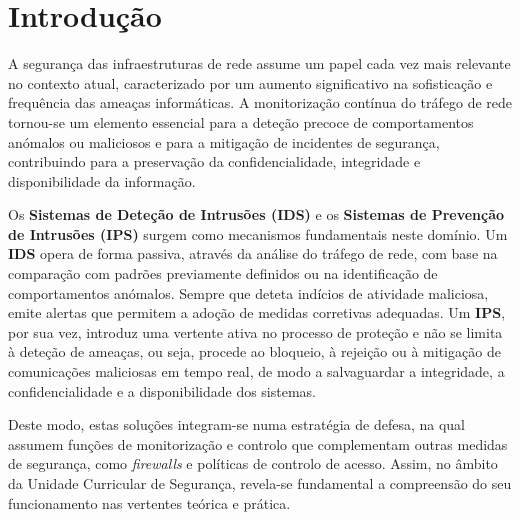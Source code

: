 
\chapter{Introdução}
A segurança das infraestruturas de rede assume um papel cada vez mais relevante no contexto atual, caracterizado por um aumento significativo na sofisticação e frequência das ameaças informáticas. A monitorização contínua do tráfego de rede tornou-se um elemento essencial para a deteção precoce de comportamentos anómalos ou maliciosos e para a mitigação de incidentes de segurança, contribuindo para a preservação da confidencialidade, integridade e disponibilidade da informação.

Os \textbf{Sistemas de Deteção de Intrusões (IDS)} e os \textbf{Sistemas de Prevenção de Intrusões (IPS)} surgem como mecanismos fundamentais neste domínio. Um \textbf{IDS} opera de forma passiva, através da análise do tráfego de rede, com base na comparação com padrões previamente definidos ou na identificação de comportamentos anómalos. Sempre que deteta indícios de atividade maliciosa, emite alertas que permitem a adoção de medidas corretivas adequadas. Um \textbf{IPS}, por sua vez, introduz uma vertente ativa no processo de proteção e não se limita à deteção de ameaças, ou seja, procede ao bloqueio, à rejeição ou à mitigação de comunicações maliciosas em tempo real, de modo a salvaguardar a integridade, a confidencialidade e a disponibilidade dos sistemas.

Deste modo, estas soluções integram-se numa estratégia de defesa, na qual assumem funções de monitorização e controlo que complementam outras medidas de segurança, como \textit{firewalls} e políticas de controlo de acesso. Assim, no âmbito da Unidade Curricular de Segurança, revela-se fundamental a compreensão do seu funcionamento nas vertentes teórica e prática.
